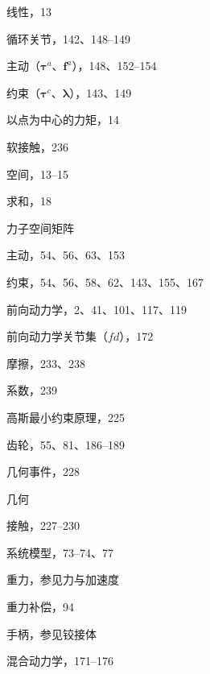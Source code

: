 \documentclass[10pt,a4paper]{book}
\theoremstyle{thmstyle} %
\theoremstyle{defstyle} %
\theoremstyle{prostyle} %
\begin{document}
线性，13



循环关节，142、148–149



主动（$\boldsymbol{\tau}^{a}$、$\boldsymbol{f}^{a}$），148、152–154



约束（$\boldsymbol{\tau}^{c}$、$\boldsymbol{\lambda}$），143、149



以点为中心的力矩，14



软接触，236



空间，13–15



求和，18



力子空间矩阵



主动，54、56、63、153



约束，54、56、58、62、143、155、167



前向动力学，2、41、101、117、119



前向动力学关节集（$fd$），172



摩擦，233、238



系数，239



高斯最小约束原理，225



齿轮，55、81、186–189



几何事件，228



几何



接触，227–230



系统模型，73–74、77



重力，参见力与加速度



重力补偿，94



手柄，参见铰接体



混合动力学，171–176
\end{document}
